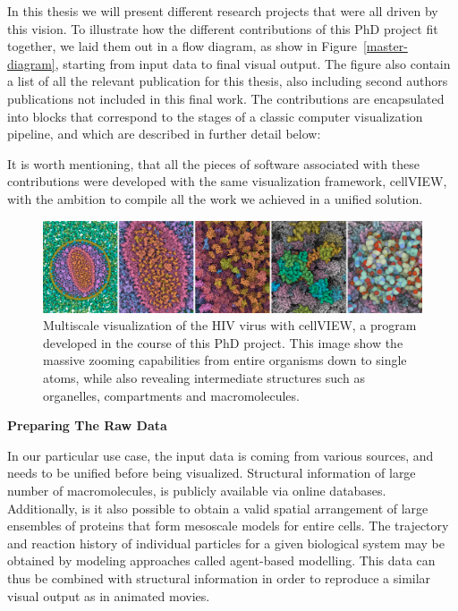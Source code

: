 In this thesis we will present different research projects that were all driven by this vision.
To illustrate how the different contributions of this PhD project fit together, we laid them out in a flow diagram, as show in Figure~\ref{master-diagram}, starting from input data to final visual output.
The figure also contain a list of all the relevant publication for this thesis, also including second authors publications not included in this final work.
The contributions are encapsulated into blocks that correspond to the stages of a classic computer visualization pipeline, and which are described in further detail below:

It is worth mentioning, that all the pieces of software associated with these contributions were developed with the same visualization framework, cellVIEW, with the ambition to compile all the work we achieved in a unified solution.

\begin{figure}
\centering
\includegraphics[width=0.99\linewidth]{graphics/teaser_new}
\caption{Multiscale visualization of the HIV virus with cellVIEW, a program developed in the course of this PhD project. This image show the massive zooming capabilities from entire organisms down to single atoms, while also revealing intermediate
	 structures such as organelles, compartments and macromolecules.}
\label{fig:teasernew}
\end{figure}





\textbf{Preparing The Raw Data}

In our particular use case, the input data is coming from various sources, and needs to be unified before being visualized.
Structural information of large number of macromolecules, is publicly available via online databases.
Additionally, is it also possible to obtain a valid spatial arrangement of large ensembles of proteins that form mesoscale models for entire cells.
The trajectory and reaction history of individual particles for a given biological system may be obtained by modeling approaches called agent-based modelling.
This data can thus be combined with structural information in order to reproduce a similar visual output as in animated movies.

